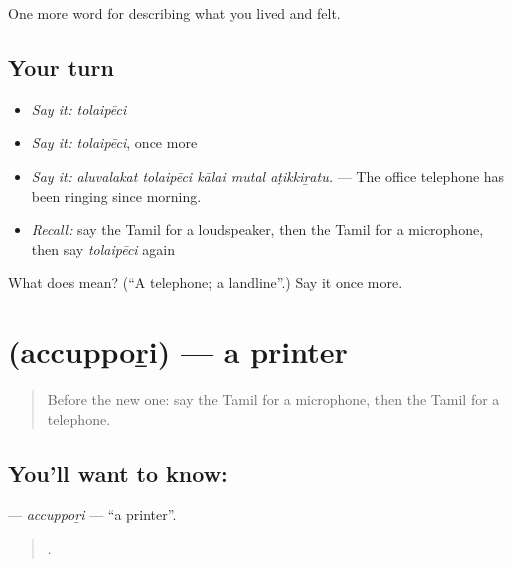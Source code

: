 \begin{grammarlens}[title={What you've built}]
One more word for describing what you lived and felt.
\end{grammarlens}

\subsection*{Your turn}
\begin{itemize}
\raggedright
  \item \emph{Say it:} \emph{tolaipēci}
  \item \emph{Say it:} \emph{tolaipēci}, once more
  \item \emph{Say it:} \emph{aluvalakat tolaipēci kālai mutal aṭikkiṟatu.} — The office telephone has been ringing since morning.
  \item \emph{Recall:} say the Tamil for a loudspeaker, then the Tamil for a microphone, then say \emph{tolaipēci} again
\end{itemize}

\begin{tcolorbox}[breakable,colback=teal!4,colframe=teal!35!black,title={Before you move on}]
What does  mean? (\textquotedblleft{}A telephone; a landline\textquotedblright{}.) Say it once more.
\end{tcolorbox}
\section[\texorpdfstring{\ta{அச்சுப்பொறி} (accuppoṟi)}{அச்சுப்பொறி (accuppoṟi)}]{ (accuppoṟi) — a printer}

\label{lesson:TA-C519-accuppori}



\begin{quote}
Before the new one: say the Tamil for a microphone, then the Tamil for a telephone.
\end{quote}

\subsection*{You'll want to know: }
\textbf{} — \emph{accuppoṟi} — \textquotedblleft{}a printer\textquotedblright{}.

\begin{quote}
  .
\end{quote}

